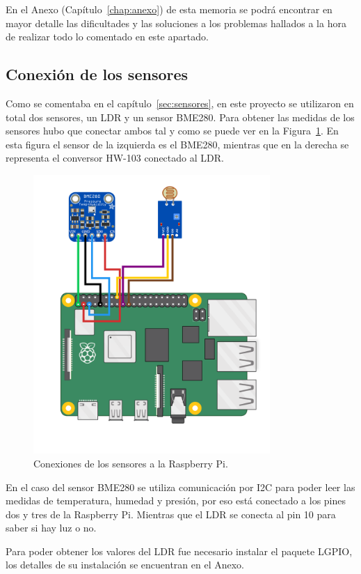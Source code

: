 \documentclass[a4paper, 12pt]{book}
\begin{document}
En el Anexo (Capítulo~\ref{chap:anexo}) de esta memoria se podrá encontrar en mayor detalle las dificultades y las soluciones a los problemas hallados a la hora de realizar todo lo comentado en este apartado.


\subsection{Conexión de los sensores}
\label{subsec:conexion_sensores}

Como se comentaba en el capítulo~\ref{sec:sensores}, en este proyecto se utilizaron en total dos sensores, un LDR y un sensor BME280. Para obtener las medidas de los sensores hubo que conectar ambos tal y como se puede ver en la Figura~\ref{fig:circuito}. En esta figura el sensor de la izquierda es el BME280, mientras que en la derecha se representa el conversor HW-103 conectado al LDR.

\begin{figure}[htb]
  \centering
  \includegraphics[width=9cm, keepaspectratio]{img/circuito.png}
  \caption{Conexiones de los sensores a la Raspberry Pi.}\label{fig:circuito}
\end{figure}

En el caso del sensor BME280 se utiliza comunicación por I2C para poder leer las medidas de temperatura, humedad y presión, por eso está conectado a los pines dos y tres de la Raspberry Pi. Mientras que el LDR se conecta al pin 10 para saber si hay luz o no.

Para poder obtener los valores del LDR fue necesario instalar el paquete LGPIO, los detalles de su instalación se encuentran en el Anexo.
\end{document}
